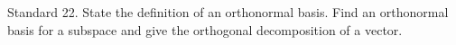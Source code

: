 Standard 22.	State the definition of an orthonormal basis. Find an orthonormal basis for a subspace and give the orthogonal decomposition of a vector. 




\ifprintanswers
\else %
 \newpage
\fi

\begin{solution}
    
\end{solution}